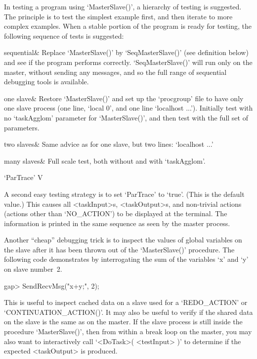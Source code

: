 \enditems

\label{debug}

In testing a program using `MasterSlave()', a  hierarchy  of  testing  is
suggested. The principle is to test the simplest example first, and  then
iterate to more complex examples. When a stable portion of the program is
ready for testing, the following sequence of tests is suggested:

\beginitems

sequential& 
    Replace `MasterSlave()' by `SeqMasterSlave()' (see definition  below)
    and see if the program performs  correctly.  `SeqMasterSlave()'  will
    run only on the master, without sending any messages, and so the full
    range of sequential debugging tools is available.

one slave&
    Restore `MasterSlave()' and set up the `procgroup' file to have  only
    one slave process (one line,  `local  0',  and  one  line  `localhost
    ...').  Initially   test   with   no   `taskAgglom'   parameter   for
    `MasterSlave()', and then test with the full set of parameters.

two slaves&
    Same advice as for one slave, but two lines: `localhost ...'

many slaves&
    Full scale test, both without and with `taskAgglom'.

\enditems

\>`ParTrace' V

A second easy testing strategy is to set `ParTrace' to `true'.  (This  is
the default value.) This  causes  all  <taskInput>s,  <taskOutput>s,  and
non-trivial actions (actions other than `NO_ACTION') to be  displayed  at
the terminal. The information is printed in the same sequence as seen  by
the master process.

Another ``cheap'' debugging trick is to  inspect  the  values  of  global
variables  on  the  slave  after  it  has  been   thrown   out   of   the
`MasterSlave()'   procedure.   The   following   code   demonstrates   by
interrogating the sum of the variables `x' and `y' on slave number~2.

\begintt
gap> SendRecvMsg("x+y;\n", 2);
\endtt

This is useful to inspect cached data on a slave used for a `REDO_ACTION'
or `CONTINUATION_ACTION()'. It may  also  be  useful  to  verify  if  the
shared data on the slave is the same as  on  the  master.  If  the  slave
process is still inside the procedure `MasterSlave()', then from within a
break loop on the  master,  you  may  also  want  to  interactively  call
`<DoTask>( <testInput> )' to determine if the  expected  <taskOutput>  is
produced.

